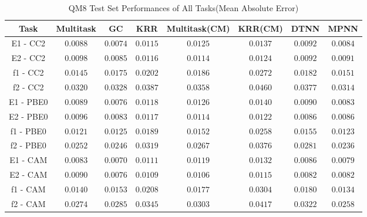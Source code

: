 \begin{table}[H]
    \small
    \centering
    \caption{QM8 Test Set Performances of All Tasks(Mean Absolute Error)}
    \begin{tabular}{ |c|c|c|c|c|c|c|c| } 
    \hline
    \textbf{Task} & Multitask & GC & KRR & Multitask(CM) & KRR(CM) & DTNN & MPNN\\
    \hline
    \hline    
    E1 - CC2 & $0.0088$ & $\mathbf{0.0074}$ & $0.0115$ & $0.0125$ & $0.0137$ & $0.0092$ & $0.0084$\\
    \hline    
    E2 - CC2 & $0.0098$ & $\mathbf{0.0085}$ & $0.0116$ & $0.0114$ & $0.0124$ & $0.0092$ & $0.0091$\\
    \hline    
    f1 - CC2 & $\mathbf{0.0145}$ & $0.0175$ & $0.0202$ & $0.0186$ & $0.0272$ & $0.0182$ & $0.0151$\\
    \hline
    f2 - CC2 & $0.0320$ & $0.0328$ & $0.0387$ & $0.0358$ & $0.0460$ & $0.0377$ & $\mathbf{0.0314}$\\
    \hline    
    E1 - PBE0 & $0.0089$ & $\mathbf{0.0076}$ & $0.0118$ & $0.0126$ & $0.0140$ & $0.0090$ & $0.0083$\\
    \hline    
    E2 - PBE0 & $0.0096$ & $\mathbf{0.0083}$ & $0.0117$ & $0.0114$ & $0.0122$ & $0.0086$ & $0.0086$\\
    \hline    
    f1 - PBE0 & $\mathbf{0.0121}$ & $0.0125$ & $0.0189$ & $0.0152$ & $0.0258$ & $0.0155$ & $0.0123$\\
    \hline
    f2 - PBE0 & $0.0252$ & $0.0246$ & $0.0319$ & $0.0267$ & $0.0376$ & $0.0281$ & $\mathbf{0.0236}$\\
    \hline    
    E1 - CAM & $0.0083$ & $\mathbf{0.0070}$ & $0.0111$ & $0.0119$ & $0.0132$ & $0.0086$ & $0.0079$\\
    \hline    
    E2 - CAM & $0.0090$ & $\mathbf{0.0076}$ & $0.0109$ & $0.0106$ & $0.0115$ & $0.0082$ & $0.0082$\\
    \hline    
    f1 - CAM & $0.0140$ & $0.0153$ & $0.0208$ & $0.0177$ & $0.0304$ & $0.0180$ & $\mathbf{0.0134}$\\
    \hline
    f2 - CAM & $0.0274$ & $0.0285$ & $0.0345$ & $0.0303$ & $0.0417$ & $0.0322$ & $\mathbf{0.0258}$\\
    \hline
    \end{tabular}
    \label{tab:QM8}
\end{table}

